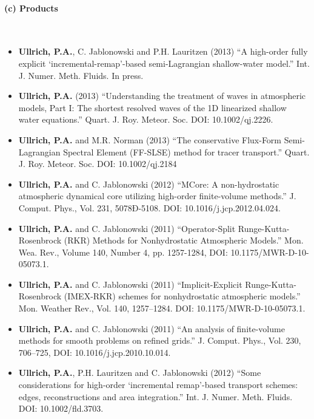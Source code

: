 \documentclass[11pt]{article}
\begin{document}
\vspace{0.8cm}
\paragraph{\large (c) Products}\ \\
\vspace{-0.8cm}
\begin{itemize}
\item \textbf{Ullrich, P.A.}, C. Jablonowski and P.H. Lauritzen (2013) ``A high-order fully explicit `incremental-remap'-based semi-Lagrangian shallow-water model.'' Int. J. Numer. Meth. Fluids. In press.

\item \textbf{Ullrich, P.A.} (2013) ``Understanding the treatment of waves in atmospheric models, Part I: The shortest resolved waves of the 1D linearized shallow water equations.'' Quart. J. Roy. Meteor. Soc. DOI: 10.1002/qj.2226. 

\item \textbf{Ullrich, P.A.} and M.R. Norman (2013) ``The conservative Flux-Form Semi-Lagrangian Spectral Element (FF-SLSE) method for tracer transport.'' Quart. J. Roy. Meteor. Soc. DOI: 10.1002/qj.2184

\item \textbf{Ullrich, P.A.} and C. Jablonowski (2012) {``MCore: A non-hydrostatic atmospheric dynamical core utilizing high-order finite-volume methods.''}  J. Comput. Phys., Vol. 231, 5078Ð-5108. DOI: 10.1016/j.jcp.2012.04.024.

\item \textbf{Ullrich, P.A.} and C. Jablonowski (2011) {``Operator-Split Runge-Kutta-Rosenbrock (RKR) Methods for Nonhydrostatic Atmospheric Models.''} Mon. Wea. Rev., Volume 140, Number 4, pp. 1257-1284, DOI: 10.1175/MWR-D-10-05073.1. 

\item \textbf{Ullrich, P.A.} and C. Jablonowski (2011) {``Implicit-Explicit Runge-Kutta-Rosenbrock (IMEX-RKR) schemes for nonhydrostatic atmospheric models.''}  Mon. Weather Rev., Vol. 140, 1257--1284.  DOI: 10.1175/MWR-D-10-05073.1.

\item \textbf{Ullrich, P.A.} and C. Jablonowski (2011) {``An analysis of finite-volume methods for smooth problems on refined grids.''} J. Comput. Phys., Vol. 230, 706--725, DOI: 10.1016/j.jcp.2010.10.014.

\item \textbf{Ullrich, P.A.}, P.H. Lauritzen and C. Jablonowski (2012) {``Some considerations for high-order `incremental remap'-based transport schemes: edges, reconstructions and area integration.''}  Int. J. Numer. Meth. Fluids.  DOI: 10.1002/fld.3703.


\end{itemize}
\end{document}
